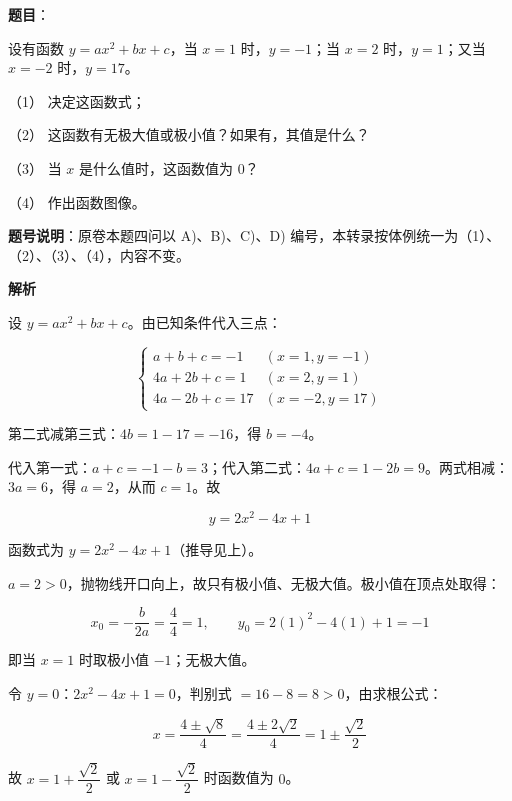 \begin{answer}

\textbf{题目}：

设有函数 $y=ax^{2}+bx+c$，当 $x=1$ 时，$y=-1$；当 $x=2$ 时，$y=1$；又当 $x=-2$ 时，$y=17$。

（1） 决定这函数式；

（2） 这函数有无极大值或极小值？如果有，其值是什么？

（3） 当 $x$ 是什么值时，这函数值为 $0$？

（4） 作出函数图像。

\begin{gktip}
\textbf{题号说明}：原卷本题四问以 A)、B)、C)、D) 编号，本转录按体例统一为（1）、（2）、（3）、（4），内容不变。
\end{gktip}

\textbf{解析}

设 $y=ax^2+bx+c$。由已知条件代入三点：

\nopagebreak[4]
\[
\begin{cases}
a+b+c=-1 & (x=1,y=-1)\\
4a+2b+c=1 & (x=2,y=1)\\
4a-2b+c=17 & (x=-2,y=17)
\end{cases}
\]

第二式减第三式：$4b=1-17=-16$，得 $b=-4$。

代入第一式：$a+c=-1-b=3$；代入第二式：$4a+c=1-2b=9$。两式相减：$3a=6$，得 $a=2$，从而 $c=1$。故

\nopagebreak[4]
\[
y=2x^2-4x+1
\]


函数式为 $y=2x^2-4x+1$（推导见上）。


$a=2>0$，抛物线开口向上，故只有极小值、无极大值。极小值在顶点处取得：

\nopagebreak[4]
\[
x_0=-\frac{b}{2a}=\frac{4}{4}=1,\qquad y_0=2(1)^2-4(1)+1=-1
\]

即当 $x=1$ 时取极小值 $-1$；无极大值。


令 $y=0$：$2x^2-4x+1=0$，判别式 $=16-8=8>0$，由求根公式：

\nopagebreak[4]
\[
x=\frac{4\pm\sqrt8}{4}=\frac{4\pm2\sqrt2}{4}=1\pm\frac{\sqrt2}{2}
\]

故 $x=1+\dfrac{\sqrt2}{2}$ 或 $x=1-\dfrac{\sqrt2}{2}$ 时函数值为 $0$。


\end{answer}
